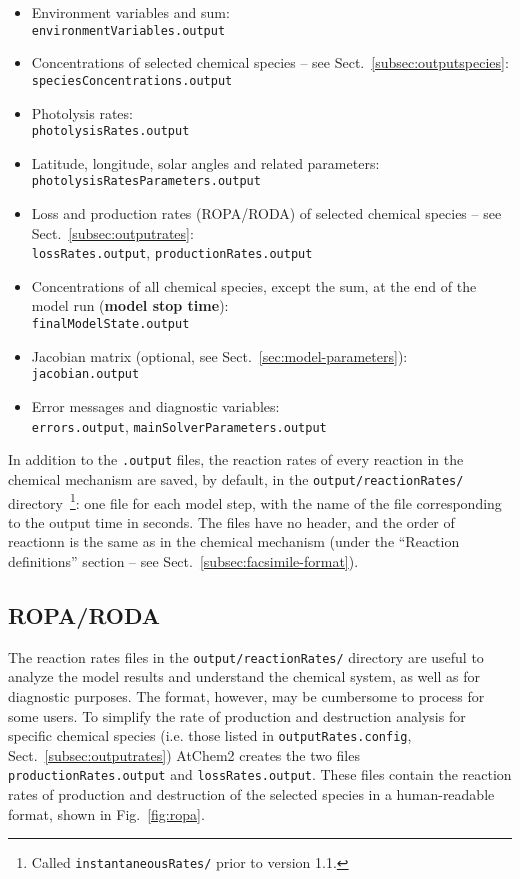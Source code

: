 \begin{itemize}
\item Environment variables and  sum:\\
  \texttt{environmentVariables.output}
\item Concentrations of selected chemical species -- see
  Sect.~\ref{subsec:outputspecies}:\\
  \texttt{speciesConcentrations.output}
\item Photolysis rates:\\
  \texttt{photolysisRates.output}
\item Latitude, longitude, solar angles and related parameters:\\
  \texttt{photolysisRatesParameters.output}
\item Loss and production rates (ROPA/RODA) of selected chemical
  species -- see Sect.~\ref{subsec:outputrates}:\\
  \texttt{lossRates.output}, \texttt{productionRates.output}
\item Concentrations of all chemical species, except the  sum,
  at the end of the model run (\textbf{model stop time}):\\
  \texttt{finalModelState.output}
\item Jacobian matrix (optional, see Sect.~\ref{sec:model-parameters}):\\
  \texttt{jacobian.output}
\item Error messages and diagnostic variables:\\
  \texttt{errors.output}, \texttt{mainSolverParameters.output}
\end{itemize}

In addition to the \texttt{.output} files, the reaction rates of every
reaction in the chemical mechanism are saved, by default, in the
\texttt{output/reactionRates/} directory~\footnote{Called
  \texttt{instantaneousRates/} prior to version 1.1.}: one file for
each model step, with the name of the file corresponding to the output
time in seconds. The files have no header, and the order of reactionn
is the same as in the chemical mechanism (under the ``Reaction
definitions'' section -- see Sect.~\ref{subsec:facsimile-format}).

\subsection{ROPA/RODA} \label{subsec:ropa-roda}

The reaction rates files in the \texttt{output/reactionRates/}
directory are useful to analyze the model results and understand the
chemical system, as well as for diagnostic purposes. The format,
however, may be cumbersome to process for some users. To simplify the
rate of production and destruction analysis for specific chemical
species (i.e. those listed in \texttt{outputRates.config},
Sect.~\ref{subsec:outputrates}) AtChem2 creates the two files
\texttt{productionRates.output} and \texttt{lossRates.output}.
These files contain the reaction rates of production and destruction
of the selected species in a human-readable format, shown in
Fig.~\ref{fig:ropa}.

